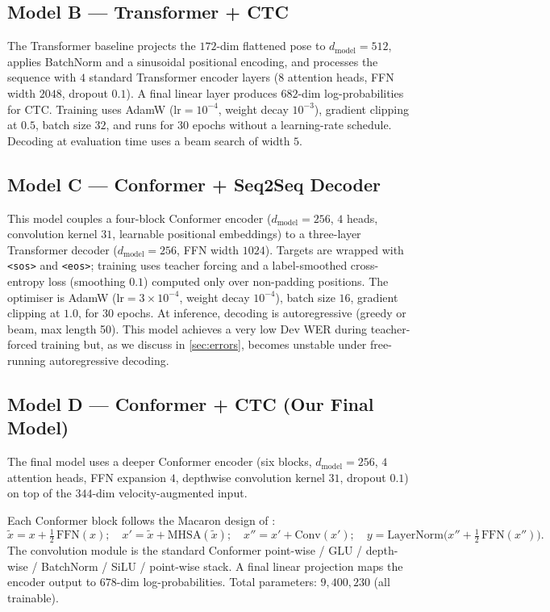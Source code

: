 \documentclass[11pt,a4paper]{article}
\newcommand{\cref}[1]{\ref{#1}}
\begin{document}
\subsection{Model B --- Transformer + CTC}
The Transformer baseline projects the $172$-dim flattened pose to $d_\mathrm{model}=512$, applies BatchNorm and a sinusoidal positional encoding, and processes the sequence with $4$ standard Transformer encoder layers ($8$ attention heads, FFN width $2048$, dropout $0.1$). A final linear layer produces $682$-dim log-probabilities for CTC. Training uses AdamW ($\mathrm{lr}=10^{-4}$, weight decay $10^{-3}$), gradient clipping at $0.5$, batch size $32$, and runs for $30$ epochs without a learning-rate schedule. Decoding at evaluation time uses a beam search of width $5$.

\subsection{Model C --- Conformer + Seq2Seq Decoder}
This model couples a four-block Conformer encoder ($d_\mathrm{model}=256$, $4$ heads, convolution kernel $31$, learnable positional embeddings) to a three-layer Transformer decoder ($d_\mathrm{model}=256$, FFN width $1024$). Targets are wrapped with \texttt{<sos>} and \texttt{<eos>}; training uses teacher forcing and a label-smoothed cross-entropy loss (smoothing $0.1$) computed only over non-padding positions. The optimiser is AdamW ($\mathrm{lr}=3\times10^{-4}$, weight decay $10^{-4}$), batch size $16$, gradient clipping at $1.0$, for 30 epochs. At inference, decoding is autoregressive (greedy or beam, max length 50). This model achieves a very low Dev WER during teacher-forced training but, as we discuss in \cref{sec:errors}, becomes unstable under free-running autoregressive decoding.

\subsection{Model D --- Conformer + CTC (Our Final Model)}
\label{sec:conformer_ctc}
The final model uses a deeper Conformer encoder (six blocks, $d_\mathrm{model}=256$, $4$ attention heads, FFN expansion $4$, depthwise convolution kernel $31$, dropout $0.1$) on top of the $344$-dim velocity-augmented input.

Each Conformer block follows the Macaron design of \cite{gulati2020conformer}:
\[
  \tilde x = x + \tfrac{1}{2}\,\mathrm{FFN}(x);\quad
  x' = \tilde x + \mathrm{MHSA}(\tilde x);\quad
  x'' = x' + \mathrm{Conv}(x');\quad
  y = \mathrm{LayerNorm}\bigl(x'' + \tfrac{1}{2}\,\mathrm{FFN}(x'')\bigr).
\]
The convolution module is the standard Conformer point-wise / GLU / depth-wise / BatchNorm / SiLU / point-wise stack. A final linear projection maps the encoder output to $678$-dim log-probabilities. Total parameters: $9{,}400{,}230$ (all trainable).
\end{document}
